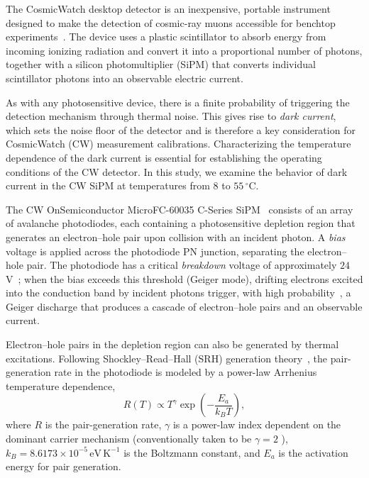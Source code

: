 \documentclass[aps,twocolumn,secnumarabic,balancelastpage,amsmath,amssymb,nofootinbib,floatfix]{revtex4-1}
\begin{document}
The CosmicWatch desktop detector is an inexpensive, portable instrument designed to make the detection of cosmic-ray muons accessible for benchtop experiments~\cite{cosmicwatch_manual}. The device uses a plastic scintillator to absorb energy from incoming ionizing radiation and convert it into a proportional number of photons, together with a silicon photomultiplier (SiPM) that converts individual scintillator photons into an observable electric current.

As with any photosensitive device, there is a finite probability of triggering the detection mechanism through thermal noise. This gives rise to \emph{dark current}, which sets the noise floor of the detector and is therefore a key consideration for CosmicWatch (CW) measurement calibrations. Characterizing the temperature dependence of the dark current is essential for establishing the operating conditions of the CW detector. In this study, we examine the behavior of dark current in the CW SiPM at temperatures from $8$ to $55\,^{\circ}\text{C}$.

The CW OnSemiconductor MicroFC-60035 C-Series SiPM~\cite{cosmicwatch_manual} consists of an array of avalanche photodiodes, each containing a photosensitive depletion region that generates an electron--hole pair upon collision with an incident photon. A \emph{bias} voltage is applied across the photodiode PN junction, separating the electron--hole pair. The photodiode has a critical \emph{breakdown} voltage of approximately $24$\,V~\cite{cosmicwatch_manual}; when the bias exceeds this threshold (Geiger mode), drifting electrons excited into the conduction band by incident photons trigger, with high probability~\cite{pagano2012}, a Geiger discharge that produces a cascade of electron--hole pairs and an observable current.

Electron--hole pairs in the depletion region can also be generated by thermal excitations. Following Shockley--Read--Hall (SRH) generation theory~\cite{shockley1952}, the pair-generation rate in the photodiode is modeled by a power-law Arrhenius temperature dependence,
\begin{equation}
    R(T) \propto T^{\gamma} \exp\!\left(-\frac{E_a}{k_B T}\right),
    \label{eq:srh}
\end{equation}
where $R$ is the pair-generation rate, $\gamma$ is a power-law index dependent on the dominant carrier mechanism (conventionally taken to be $\gamma = 2$ \cite{shockley1952}), $k_B = 8.6173 \times 10^{-5}\,\text{eV}\,\text{K}^{-1}$ is the Boltzmann constant, and $E_a$ is the activation energy for pair generation.
\end{document}
